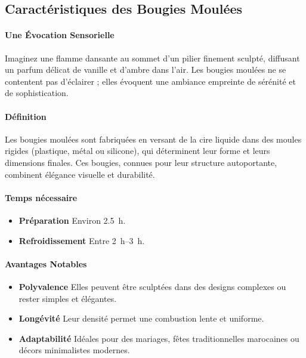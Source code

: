 \documentclass[11pt,fleqn,onecolumn,oneside]{book}
\begin{document}
\subsection*{Caractéristiques des Bougies Moulées}

\paragraph{Une Évocation Sensorielle}
Imaginez une flamme dansante au sommet d'un pilier finement sculpté, diffusant un parfum délicat de vanille et d’ambre dans l’air. Les bougies moulées ne se contentent pas d’éclairer ; elles évoquent une ambiance empreinte de sérénité et de sophistication.

\paragraph{Définition}
Les bougies moulées sont fabriquées en versant de la cire liquide dans des moules rigides (plastique, métal ou silicone), qui déterminent leur forme et leurs dimensions finales. Ces bougies, connues pour leur structure autoportante, combinent élégance visuelle et durabilité.


\paragraph{Temps nécessaire}
\begin{itemize}
    \item \textbf{Préparation} Environ \SI{2.5}{\hour}.
    \item \textbf{Refroidissement} Entre \SIrange{2}{3}{\hour}.
\end{itemize}

\paragraph{Avantages Notables}
\begin{itemize}
    \item \textbf{Polyvalence} Elles peuvent être sculptées dans des designs complexes ou rester simples et élégantes.
    \item \textbf{Longévité} Leur densité permet une combustion lente et uniforme.
    \item \textbf{Adaptabilité} Idéales pour des mariages, fêtes traditionnelles marocaines ou décors minimalistes modernes.
\end{itemize}
\end{document}
